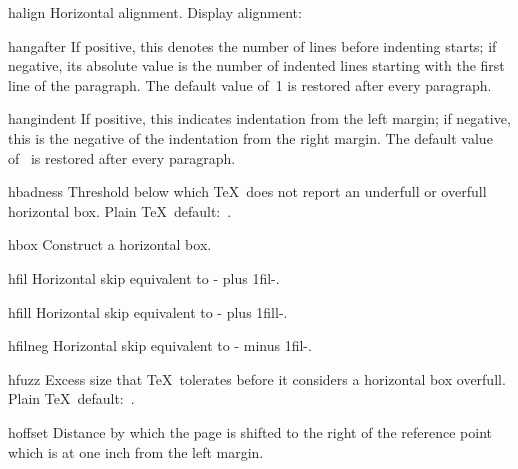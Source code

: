 \item halign\lb{}\rb{}
      Horizontal alignment.
      Display alignment:
      \disp\n{\$\$}\lb{}\rb
      \n{\$\$}\dispstop

\item hangafter
      If positive, this denotes the number of lines 
      before indenting starts; 
      if negative, its absolute value is the number 
      of indented lines starting with the first line of the paragraph. 
      The default value of~1 is restored after every paragraph.

\item hangindent
      If positive, this indicates indentation from the left margin; 
      if negative, this is the negative of the indentation 
      from the right margin. 
      The default value of~\n{0pt} is restored after every paragraph.

\item hbadness
      Threshold below which \TeX\ does not report an underfull 
      or overfull  horizontal box.
      Plain \TeX\ default:~.

\item hbox\lb{}\rb
      Construct a horizontal box. 

\item hfil
      Horizontal skip equivalent to \ver-\hskip 0cm plus 1fil-.

\item hfill
      Horizontal skip equivalent to \ver-\hskip 0cm plus 1fill-.

\item hfilneg
      Horizontal skip equivalent to \ver-\hskip 0cm minus 1fil-.

\item hfuzz
      Excess size that \TeX\ tolerates before it considers  
      a horizontal box overfull.
      Plain \TeX\ default:~\n{0.1pt}.

\item hoffset
      Distance by which the page is shifted to the right 
      of the reference point which is at one inch from
      the left margin.

